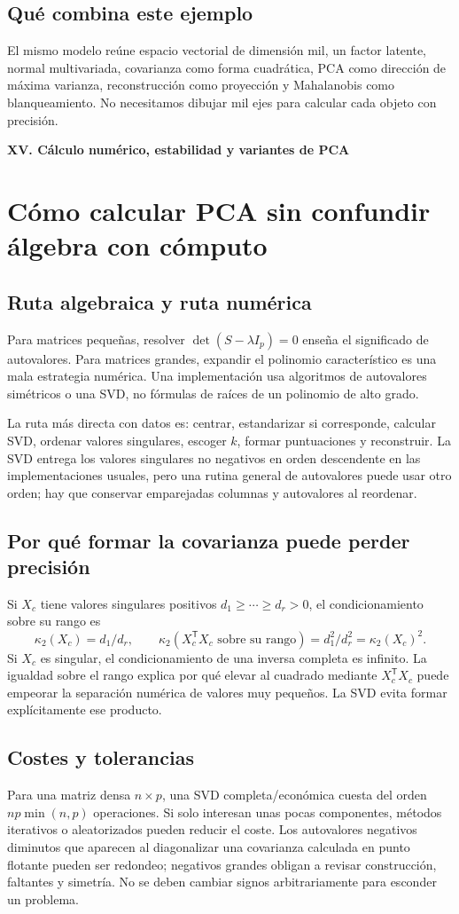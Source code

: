 \documentclass[11pt,a4paper]{article}
\newcommand{\T}{^{\mathsf T}}
\theoremstyle{definition}
\newcommand{\parte}[1]{\par\bigskip\Needspace{8\baselineskip}\begin{center}{\Large\bfseries\color{azul}#1}\end{center}}
\begin{document}
\subsection{Qué combina este ejemplo}
El mismo modelo reúne espacio vectorial de dimensión mil, un factor latente, normal multivariada, covarianza como forma cuadrática, PCA como dirección de máxima varianza, reconstrucción como proyección y Mahalanobis como blanqueamiento. No necesitamos dibujar mil ejes para calcular cada objeto con precisión.

\parte{XV. Cálculo numérico, estabilidad y variantes de PCA}
\section{Cómo calcular PCA sin confundir álgebra con cómputo}
\subsection{Ruta algebraica y ruta numérica}
Para matrices pequeñas, resolver $\det(S-\lambda I_p)=0$ enseña el significado de autovalores. Para matrices grandes, expandir el polinomio característico es una mala estrategia numérica. Una implementación usa algoritmos de autovalores simétricos o una SVD, no fórmulas de raíces de un polinomio de alto grado.

La ruta más directa con datos es: centrar, estandarizar si corresponde, calcular SVD, ordenar valores singulares, escoger $k$, formar puntuaciones y reconstruir. La SVD entrega los valores singulares no negativos en orden descendente en las implementaciones usuales, pero una rutina general de autovalores puede usar otro orden; hay que conservar emparejadas columnas y autovalores al reordenar.
\subsection{Por qué formar la covarianza puede perder precisión}
Si $X_c$ tiene valores singulares positivos $d_1\ge\cdots\ge d_r>0$, el condicionamiento sobre su rango es
\[
\kappa_2(X_c)=d_1/d_r,\qquad
\kappa_2(X_c\T X_c\text{ sobre su rango})=d_1^2/d_r^2=\kappa_2(X_c)^2.
\]
Si $X_c$ es singular, el condicionamiento de una inversa completa es infinito. La igualdad sobre el rango explica por qué elevar al cuadrado mediante $X_c\T X_c$ puede empeorar la separación numérica de valores muy pequeños. La SVD evita formar explícitamente ese producto.
\subsection{Costes y tolerancias}
Para una matriz densa $n\times p$, una SVD completa/económica cuesta del orden $np\min(n,p)$ operaciones. Si solo interesan unas pocas componentes, métodos iterativos o aleatorizados pueden reducir el coste. Los autovalores negativos diminutos que aparecen al diagonalizar una covarianza calculada en punto flotante pueden ser redondeo; negativos grandes obligan a revisar construcción, faltantes y simetría. No se deben cambiar signos arbitrariamente para esconder un problema.
\end{document}

